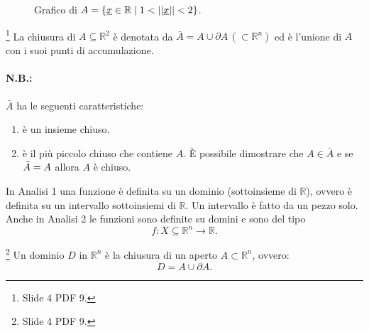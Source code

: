 \begin{example}
\begin{figure}
    \caption{Grafico di $A=\{\uline x\in\mathbb R\;|\; 1<||\uline x||<2\}$.}\label{fig:esempio_punti_accumulazione}
    \end{figure}
\end{example}

\begin{definition}\footnote{Slide 4 PDF 9.}
    La chiusura di $A\subseteq\mathbb R^2$ è denotata da $\bar A=A\cup\partial A\, (\subset\mathbb R^n)$ ed è l'unione di $A$ con i suoi punti di accumulazione.
\end{definition}

\paragraph{N.B.:} $\bar A$ ha le seguenti caratteristiche:
\begin{enumerate}
    \item è un insieme chiuso.
    \item è il più piccolo chiuso che contiene $A$. È possibile dimostrare che $A\in\bar A$ e se $\Bar A=A$ allora $A$ è chiuso.
\end{enumerate}

In Analisi 1 una funzione è definita su un dominio (sottoinsieme di $\mathbb R$), ovvero è definita su un intervallo sottoinsiemi di $\mathbb R$. Un intervallo è fatto da un pezzo solo. Anche in Analisi 2 le funzioni sono definite su domini e sono del tipo
\begin{equation*}
    f\colon X\subseteq\mathbb R^n\rightarrow\mathbb R.
\end{equation*}

\begin{definition}[Dominio]\label{def:dominio}\footnote{Slide 4 PDF 9.}
    Un dominio $D$ in $\mathbb R^n$ è la chiusura di un aperto $A\subset\mathbb R^n$, ovvero:
    \begin{equation}\label{eq:dominio_R_n}
        D=A\cup\partial A.
    \end{equation}
\end{definition}

